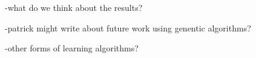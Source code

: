 -what do we think about the results?

-patrick might write about future work using genentic algorithms?

-other forms of learning algorithms?